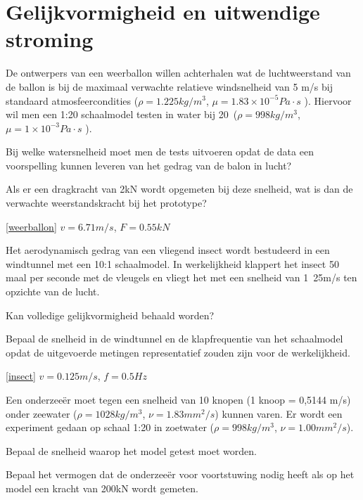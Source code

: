 \chapter{Gelijkvormigheid en uitwendige stroming}
\label{sec:Gelijkvormigheid en uitwendige stroming}
\begin{toepassing}[*]
	\label{weerballon}
De ontwerpers van een weerballon willen achterhalen wat de luchtweerstand van de ballon is bij de maximaal verwachte relatieve windsnelheid van 5 m/s bij standaard atmosfeercondities ($\rho = 1.225\unit{kg/m^3}$, $\mu = 1.83\times 10^{-5}\unit{Pa \cdot s}$ ).
Hiervoor wil men een 1:20 schaalmodel testen in water bij 20\degC\ ($\rho = 998\unit{kg/m^3}$, $\mu = 1\times 10^{-3}\unit{Pa \cdot s}$ ). 
		
Bij welke watersnelheid moet men de tests uitvoeren opdat de data een voorspelling kunnen leveren van het gedrag van de balon in lucht? 
		
Als er een dragkracht van 2\unit{kN} wordt opgemeten bij deze snelheid, wat is dan de verwachte weerstandskracht bij het prototype?
\end{toepassing}
\begin{antwoord}{\ref{weerballon}}
	$v = 6.71\unit{m/s}$, $F = 0.55\unit{kN}$
\end{antwoord}
\begin{toepassing}[*]
	\label{insect}
Het aerodynamisch gedrag van een vliegend insect wordt bestudeerd in een windtunnel met een 10:1 schaalmodel. In werkelijkheid klappert het insect 50 maal per seconde met de vleugels en vliegt het met een snelheid van \unit{1.25}{m/s} ten opzichte van de lucht. 
		
Kan volledige gelijkvormigheid behaald worden?
		
Bepaal de snelheid in de windtunnel en de klapfrequentie van het schaalmodel opdat de uitgevoerde metingen representatief zouden zijn voor de werkelijkheid.
\end{toepassing}
\begin{antwoord}{\ref{insect}}
	$v = 0.125\unit{m/s}$, $f = 0.5\unit{Hz}$
\end{antwoord}
\begin{toepassing}[*]
	\label{onderzeeer}	
Een onderzeeër moet tegen een snelheid van 10 knopen (1 knoop = 0,5144 m/s) onder zeewater ($\rho = 1028\unit{kg/m^3}$, $\nu = 1.83\unit{mm^2/s}$) kunnen varen. Er wordt een experiment gedaan op schaal 1:20 in zoetwater ($\rho = 998\unit{kg/m^3}$, $\nu = 1.00\unit{mm^2/s}$).
		
Bepaal de snelheid waarop het model getest moet worden.
		
Bepaal het vermogen dat de onderzeeër voor voortstuwing nodig heeft als op het model een kracht van 200\unit{kN} wordt gemeten.
\end{toepassing}
